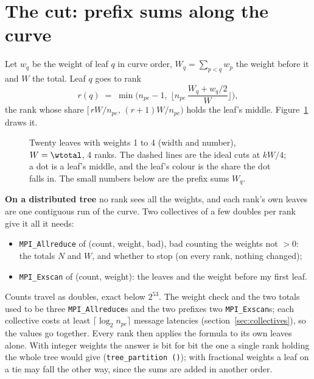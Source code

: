 \documentclass[10pt,a4paper]{article}
\theoremstyle{definition}
\newcommand{\fn}[1]{\texttt{#1}}
\begin{document}


\section{The cut: prefix sums along the curve}
\label{sec:cut}

Let $w_q$ be the weight of leaf $q$ in curve order, $W_q = \sum_{p<q} w_p$
the weight before it and $W$ the total. Leaf $q$ goes to rank
\[
  r(q) \;=\; \min\!\Big(n_{pe}-1,\;
    \Big\lfloor n_{pe}\,\frac{W_q + w_q/2}{W} \Big\rfloor\Big),
\]
the rank whose share $[\,rW/n_{pe},\,(r+1)W/n_{pe})$ holds the leaf's
middle. Figure~\ref{fig:weights} draws it.

\begin{figure}[h]
  \centering
  \begin{tikzpicture}\end{tikzpicture}
  \caption{Twenty leaves with weights 1 to 4 (width and number), $W =
    \wtotal$, 4 ranks. The dashed lines are the ideal cuts at $kW/4$; a
    dot is a leaf's middle, and the leaf's colour is the share the dot
    falls in. The small numbers below are the prefix sums $W_q$.}
  \label{fig:weights}
\end{figure}

\textbf{On a distributed tree} no rank sees all the weights, and each
rank's own leaves are one contiguous run of the curve. Two collectives of
a few doubles per rank give it all it needs:
\begin{itemize}
  \item \fn{MPI\_Allreduce} of (count, weight, bad), bad counting the
    weights not $> 0$: the totals $N$ and $W$, and whether to stop
    (on every rank, nothing changed);
  \item \fn{MPI\_Exscan} of (count, weight): the leaves and the weight
    before my first leaf.
\end{itemize}
Counts travel as doubles, exact below $2^{53}$. The weight check and the
two totals used to be three \fn{MPI\_Allreduce}s and the two prefixes two
\fn{MPI\_Exscan}s; each collective costs at least $\lceil\log_2
n_{pe}\rceil$ message latencies (section~\ref{sec:collectives}), so the
values go together.
Every rank then applies the formula to its own leaves alone. With integer
weights the answer is bit for bit the one a single rank holding the whole
tree would give (\fn{tree\_partition ()}); with fractional weights a leaf
on a tie may fall the other way, since the sums are added in another
order.
\end{document}

